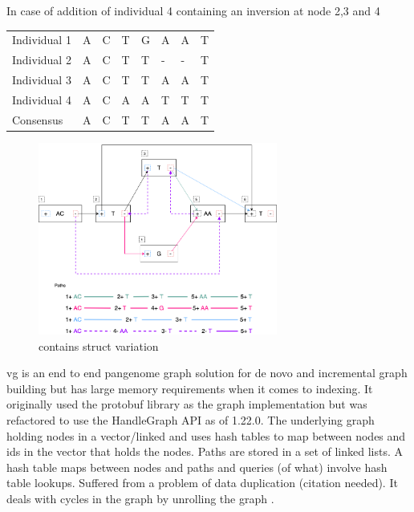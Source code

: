 \documentclass[11pt]{article}
\begin{document}
\newpage
In case of addition of individual 4 containing an inversion at node 2,3 and 4

\begin{center}
\begin{tabular}{llllllll}
\color{mypink}Individual 1 & \color{mypink} A & \color{mypink} C & \color{mypink} T & \color{mypink} G & \color{mypink} A & \color{mypink} A & \color{mypink} T\\
\color{myblue}Individual 2 & \color{myblue} A & \color{myblue} C & \color{myblue} T & \color{myblue} T & \color{myblue} - & \color{myblue} - & \color{myblue} T\\
\color{mygreen}Individual 3 & \color{mygreen} A & \color{mygreen} C & \color{mygreen} T & \color{mygreen} T & \color{mygreen} A & \color{mygreen} A & \color{mygreen} T\\
\color{mypurple}Individual 4 & \color{mypurple} A & \color{mypurple} C & \color{mypurple} A & \color{mypurple} A & \color{mypurple} T & \color{mypurple} T & \color{mypurple} T\\
\hline
\color{red}Consensus & \color{red} A & \color{red} C & \color{red} T & \color{red} T & \color{red} A & \color{myred} A & \color{red} T\\
\end{tabular}
\end{center}


\begin{figure}[H]
\centering
\includegraphics[width=0.7\textwidth]{figures/Variation Graph-Page-2.png} 
\caption{contains struct variation}\label{contains struct}
\end{figure}

vg \cite{garrisonVariationGraphToolkit2018} is an end to end pangenome graph
solution for de novo and incremental graph building but has large memory
requirements when it comes to indexing.
It originally used the protobuf library as the graph implementation but was
refactored to use the HandleGraph API as of 1.22.0.
The underlying graph holding nodes in a vector/linked and uses hash tables to
 map between nodes and ids in the vector that holds the nodes.
Paths are stored in a set of linked lists. 
A hash table maps between nodes and paths and queries (of what) involve hash
table lookups.
Suffered from a problem of data duplication (citation needed).
It deals with cycles in the graph by unrolling the graph
\cite{liDesignConstructionReference2020}.
\end{document}
